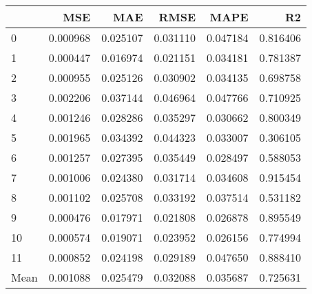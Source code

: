 \begin{tabular}{lrrrrr}
\toprule
 & MSE & MAE & RMSE & MAPE & R2 \\
\midrule
0 & 0.000968 & 0.025107 & 0.031110 & 0.047184 & 0.816406 \\
1 & 0.000447 & 0.016974 & 0.021151 & 0.034181 & 0.781387 \\
2 & 0.000955 & 0.025126 & 0.030902 & 0.034135 & 0.698758 \\
3 & 0.002206 & 0.037144 & 0.046964 & 0.047766 & 0.710925 \\
4 & 0.001246 & 0.028286 & 0.035297 & 0.030662 & 0.800349 \\
5 & 0.001965 & 0.034392 & 0.044323 & 0.033007 & 0.306105 \\
6 & 0.001257 & 0.027395 & 0.035449 & 0.028497 & 0.588053 \\
7 & 0.001006 & 0.024380 & 0.031714 & 0.034608 & 0.915454 \\
8 & 0.001102 & 0.025708 & 0.033192 & 0.037514 & 0.531182 \\
9 & 0.000476 & 0.017971 & 0.021808 & 0.026878 & 0.895549 \\
10 & 0.000574 & 0.019071 & 0.023952 & 0.026156 & 0.774994 \\
11 & 0.000852 & 0.024198 & 0.029189 & 0.047650 & 0.888410 \\
Mean & 0.001088 & 0.025479 & 0.032088 & 0.035687 & 0.725631 \\
\bottomrule
\end{tabular}
